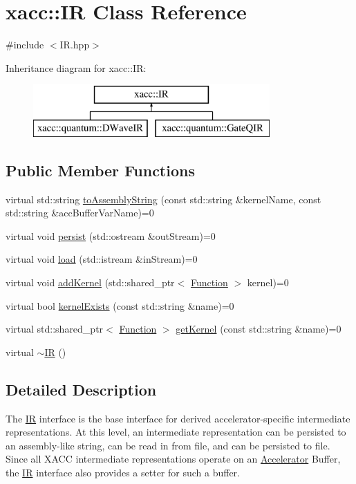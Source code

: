 \hypertarget{a00041}{}\section{xacc\+:\+:IR Class Reference}
\label{a00041}


{\ttfamily \#include $<$I\+R.\+hpp$>$}

Inheritance diagram for xacc\+:\+:IR\+:\begin{figure}[H]
\begin{center}
\leavevmode
\includegraphics[height=2.000000cm]{a00041}
\end{center}
\end{figure}
\subsection*{Public Member Functions}
\begin{DoxyCompactItemize}
\item 
virtual std\+::string \hyperlink{a00041_a8356cdff1919b88eabeb84fd7450cdb6}{to\+Assembly\+String} (const std\+::string \&kernel\+Name, const std\+::string \&acc\+Buffer\+Var\+Name)=0
\item 
virtual void \hyperlink{a00041_a414b72224d88473ad6190bb88102a3ea}{persist} (std\+::ostream \&out\+Stream)=0
\item 
virtual void \hyperlink{a00041_a444c2e4dc0faac500fb70fa93997e9bc}{load} (std\+::istream \&in\+Stream)=0
\item 
virtual void \hyperlink{a00041_abbbf8e6993c518597de32cd05d49d737}{add\+Kernel} (std\+::shared\+\_\+ptr$<$ \hyperlink{a00030}{Function} $>$ kernel)=0
\item 
virtual bool \hyperlink{a00041_afc9ccf5126f3fed19c2e879133b2f6d8}{kernel\+Exists} (const std\+::string \&name)=0
\item 
virtual std\+::shared\+\_\+ptr$<$ \hyperlink{a00030}{Function} $>$ \hyperlink{a00041_a6f49b4ba4b3a15142b04873284885f0d}{get\+Kernel} (const std\+::string \&name)=0
\item 
virtual \hyperlink{a00041_a09a76d71092254acae07e19fa2f34921}{$\sim$\+IR} ()
\end{DoxyCompactItemize}


\subsection{Detailed Description}
The \hyperlink{a00041}{IR} interface is the base interface for derived accelerator-\/specific intermediate representations. At this level, an intermediate representation can be persisted to an assembly-\/like string, can be read in from file, and can be persisted to file. Since all X\+A\+CC intermediate representations operate on an \hyperlink{a00011}{Accelerator} Buffer, the \hyperlink{a00041}{IR} interface also provides a setter for such a buffer. 

